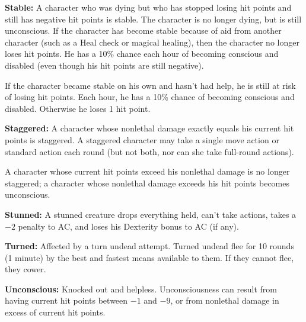 \textbf{Stable:} A character who was dying but who has stopped losing hit points and still has negative hit points is stable. The character is no longer dying, but is still unconscious. If the character has become stable because of aid from another character (such as a Heal check or magical healing), then the character no longer loses hit points. He has a 10\% chance each hour of becoming conscious and disabled (even though his hit points are still negative).

If the character became stable on his own and hasn't had help, he is still at risk of losing hit points. Each hour, he has a 10\% chance of becoming conscious and disabled. Otherwise he loses 1 hit point.

\textbf{Staggered:} A character whose nonlethal damage exactly equals his current hit points is staggered. A staggered character may take a single move action or standard action each round (but not both, nor can she take full-round actions).

A character whose current hit points exceed his nonlethal damage is no longer staggered; a character whose nonlethal damage exceeds his hit points becomes unconscious.

\textbf{Stunned:} A stunned creature drops everything held, can't take actions, takes a $-2$ penalty to AC, and loses his Dexterity bonus to AC (if any).

\textbf{Turned:} Affected by a turn undead attempt. Turned undead flee for 10 rounds (1 minute) by the best and fastest means available to them. If they cannot flee, they cower.

\textbf{Unconscious:} Knocked out and helpless. Unconsciousness can result from having current hit points between $-1$ and $-9$, or from nonlethal damage in excess of current hit points.